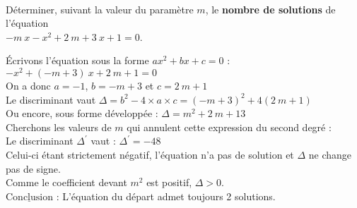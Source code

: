 \documentclass[a4paper,11pt,exos]{nsi} %
\begin{document}



\maketitle\

\begin{exercice}
    Déterminer, suivant la valeur du paramètre $m$, le \textbf{nombre de solutions} de l'équation\\ $-m~x-x^{2}+2~m+3~x+1=0$.
\end{exercice}


Écrivons l'équation sous la forme $ax^2+bx+c=0$ :\\$-x^{2}+(-m+3)~x+2~m+1=0$\\On a donc $a=-1$, $b=-m+3$ et $c=2~m+1$\\Le discriminant vaut $\Delta=b^2-4\times a\times c = \left(-m+3\right)^{2}+4 (2~m+1)$\\Ou encore, sous forme développée : $\Delta = m^{2}+2~m+13$\\Cherchons les valeurs de $m$ qui annulent cette expression du second degré :\\Le discriminant $\Delta^\prime$ vaut : $\Delta^\prime =-48$\\Celui-ci étant strictement négatif, l'équation n'a pas de solution et $\Delta$ ne change pas de signe.\\Comme le coefficient devant $m^2$ est positif, $\Delta > 0$.\\$\underline{\text{Conclusion}}$ : L'équation du départ admet toujours 2 solutions.
\end{document}
